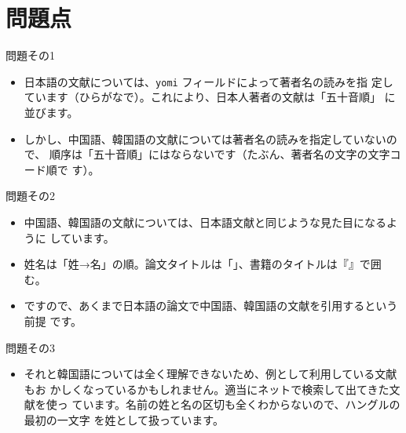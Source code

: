 \documentclass[article]{jlreq}
\begin{document}
\section{問題点}

問題その1
\begin{itemize}
 \item 日本語の文献については、\texttt{yomi} フィールドによって著者名の読みを指
       定しています（ひらがなで）。これにより、日本人著者の文献は「五十音順」
       に並びます。
 \item しかし、中国語、韓国語の文献については著者名の読みを指定していないので、
       順序は「五十音順」にはならないです（たぶん、著者名の文字の文字コード順で
       す）。
\end{itemize}

問題その2
\begin{itemize}
 \item 中国語、韓国語の文献については、日本語文献と同じような見た目になるように
       しています。
 \item 姓名は「姓→名」の順。論文タイトルは「」、書籍のタイトルは『』で囲む。
 \item ですので、あくまで日本語の論文で中国語、韓国語の文献を引用するという前提
       です。
\end{itemize}

問題その3
\begin{itemize}
 \item それと韓国語については全く理解できないため、例として利用している文献もお
       かしくなっているかもしれません。適当にネットで検索して出てきた文献を使っ
       ています。名前の姓と名の区切も全くわからないので、ハングルの最初の一文字
       を姓として扱っています。
\end{itemize}

\nocite{*}



%

\end{document}
